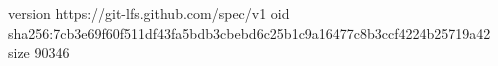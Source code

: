 version https://git-lfs.github.com/spec/v1
oid sha256:7cb3e69f60f511df43fa5bdb3cbebd6c25b1c9a16477c8b3ccf4224b25719a42
size 90346
